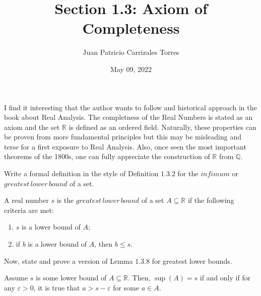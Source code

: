 \documentclass[12pt]{article}
\newcommand{\R}{\mathbb{R}}
\newcommand{\Q}{\mathbb{Q}}
\newenvironment{problem}[2][Problem]{\begin{trivlist}
		\item[\hskip \labelsep {\bfseries #1}\hskip \labelsep {\bfseries #2.}]}{\end{trivlist}}
\newenvironment{solution}[2][Solution]{\begin{trivlist}
		\item[\hskip \labelsep {\bfseries #1}\hskip \labelsep {\bfseries #2.}]}{\end{trivlist}}
\begin{document}
	
	\title{Section 1.3: Axiom of Completeness}
	\author{Juan Patricio Carrizales Torres}
	\date{May 09, 2022}
	\maketitle
	
	I find it interesting that the author wants to follow and historical approach in the book about Real Analysis. The completness of the Real Numbers is stated as an axiom and the set $\R$ is defined as an ordered field. Naturally, these properties can be proven from more fundamental principles but this may be misleading and terse for a first exposure to Real Analysis. Also, once seen the most important theorems of the 1800s, one can fully appreciate the construction of $\R$ from $\Q$. \\
	
	\begin{problem}{1.3.1}
		\begin{enumerate}[label=(\alph*)]
			\item Write a formal definition in the style of Definition $1.3.2$ for the $infimum$ or $greatest \, lower \, bound$ of a set. 
			\begin{solution}{a}
				A real number $s$ is the $greatest \, lower \, bound$ of a set $A\subseteq \R$ if the following criteria are met:
				\begin{enumerate}[label=\arabic*)]
					\item $s$ is a lower bound of $A$;
					\item if $b$ is a lower bound of $A$, then $b\leq s$.
				\end{enumerate}
			\end{solution}
			\item Now, state and prove a version of Lemma $1.3.8$ for greatest lower bounds. 
			\begin{solution}{b}
				Assume $s$ is some lower bound of $A\subseteq \R$. Then, $\sup(A) = s$ if and only if for any $\varepsilon > 0$, it is true that $a> s-\varepsilon$ for some $a\in A$.
			\end{solution}
		\end{enumerate}
	\end{problem}
	
\end{document}
